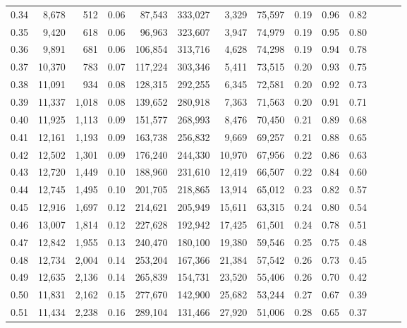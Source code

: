 \begin{tabular}{rrrrrrrrrrrrrr}
0.34 &   8,678 &    512 &  0.06 &   87,543 &  333,027 &   3,329 &  75,597 &  0.19 &  0.96 &      0.82 \\
0.35 &   9,420 &    618 &  0.06 &   96,963 &  323,607 &   3,947 &  74,979 &  0.19 &  0.95 &      0.80 \\
0.36 &   9,891 &    681 &  0.06 &  106,854 &  313,716 &   4,628 &  74,298 &  0.19 &  0.94 &      0.78 \\
0.37 &  10,370 &    783 &  0.07 &  117,224 &  303,346 &   5,411 &  73,515 &  0.20 &  0.93 &      0.75 \\
0.38 &  11,091 &    934 &  0.08 &  128,315 &  292,255 &   6,345 &  72,581 &  0.20 &  0.92 &      0.73 \\
0.39 &  11,337 &  1,018 &  0.08 &  139,652 &  280,918 &   7,363 &  71,563 &  0.20 &  0.91 &      0.71 \\
0.40 &  11,925 &  1,113 &  0.09 &  151,577 &  268,993 &   8,476 &  70,450 &  0.21 &  0.89 &      0.68 \\
0.41 &  12,161 &  1,193 &  0.09 &  163,738 &  256,832 &   9,669 &  69,257 &  0.21 &  0.88 &      0.65 \\
0.42 &  12,502 &  1,301 &  0.09 &  176,240 &  244,330 &  10,970 &  67,956 &  0.22 &  0.86 &      0.63 \\
0.43 &  12,720 &  1,449 &  0.10 &  188,960 &  231,610 &  12,419 &  66,507 &  0.22 &  0.84 &      0.60 \\
0.44 &  12,745 &  1,495 &  0.10 &  201,705 &  218,865 &  13,914 &  65,012 &  0.23 &  0.82 &      0.57 \\
0.45 &  12,916 &  1,697 &  0.12 &  214,621 &  205,949 &  15,611 &  63,315 &  0.24 &  0.80 &      0.54 \\
0.46 &  13,007 &  1,814 &  0.12 &  227,628 &  192,942 &  17,425 &  61,501 &  0.24 &  0.78 &      0.51 \\
0.47 &  12,842 &  1,955 &  0.13 &  240,470 &  180,100 &  19,380 &  59,546 &  0.25 &  0.75 &      0.48 \\
0.48 &  12,734 &  2,004 &  0.14 &  253,204 &  167,366 &  21,384 &  57,542 &  0.26 &  0.73 &      0.45 \\
0.49 &  12,635 &  2,136 &  0.14 &  265,839 &  154,731 &  23,520 &  55,406 &  0.26 &  0.70 &      0.42 \\
0.50 &  11,831 &  2,162 &  0.15 &  277,670 &  142,900 &  25,682 &  53,244 &  0.27 &  0.67 &      0.39 \\
0.51 &  11,434 &  2,238 &  0.16 &  289,104 &  131,466 &  27,920 &  51,006 &  0.28 &  0.65 &      0.37 \\

\end{tabular}
